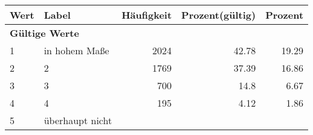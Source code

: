      \begin{longtable}{lXrrr}
     \toprule
     \textbf{Wert} & \textbf{Label} & \textbf{Häufigkeit} & \textbf{Prozent(gültig)} & \textbf{Prozent} \\
     \endhead
     \midrule
     \multicolumn{5}{l}{\textbf{Gültige Werte}}\\

     1 &
     \multicolumn{1}{X}{ in hohem Maße   } &


       \num{2024} &
       \num[round-mode=places,round-precision=2]{42,78} &
         \num[round-mode=places,round-precision=2]{19,29} \\

     2 &
     \multicolumn{1}{X}{ 2   } &


       \num{1769} &
       \num[round-mode=places,round-precision=2]{37,39} &
         \num[round-mode=places,round-precision=2]{16,86} \\

     3 &
     \multicolumn{1}{X}{ 3   } &


       \num{700} &
       \num[round-mode=places,round-precision=2]{14,8} &
         \num[round-mode=places,round-precision=2]{6,67} \\

     4 &
     \multicolumn{1}{X}{ 4   } &


       \num{195} &
       \num[round-mode=places,round-precision=2]{4,12} &
         \num[round-mode=places,round-precision=2]{1,86} \\

     5 &
     \multicolumn{1}{X}{ überhaupt nicht   } &



\end{longtable}
